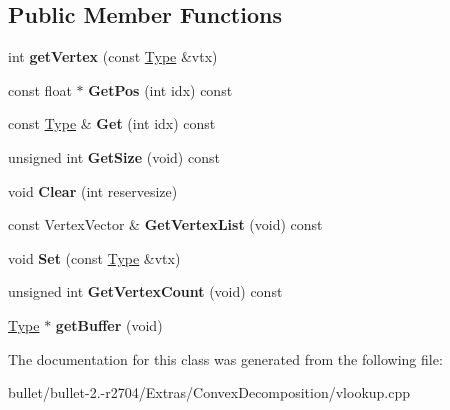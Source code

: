 \subsection*{Public Member Functions}
\begin{DoxyCompactItemize}
\item 
\hypertarget{class_vlookup_1_1_vertex_pool_a616b1df292eba5fe590800434a510fe2}{int {\bfseries get\+Vertex} (const \hyperlink{struct_type}{Type} \&vtx)}\label{class_vlookup_1_1_vertex_pool_a616b1df292eba5fe590800434a510fe2}

\item 
\hypertarget{class_vlookup_1_1_vertex_pool_aa6c1040fa6a38110dada2b7784842598}{const float $\ast$ {\bfseries Get\+Pos} (int idx) const }\label{class_vlookup_1_1_vertex_pool_aa6c1040fa6a38110dada2b7784842598}

\item 
\hypertarget{class_vlookup_1_1_vertex_pool_a84306e1f0516c4f7c217e30a2bb79e24}{const \hyperlink{struct_type}{Type} \& {\bfseries Get} (int idx) const }\label{class_vlookup_1_1_vertex_pool_a84306e1f0516c4f7c217e30a2bb79e24}

\item 
\hypertarget{class_vlookup_1_1_vertex_pool_a33f4065325a03ea3ebb6f8d15a5ce8ec}{unsigned int {\bfseries Get\+Size} (void) const }\label{class_vlookup_1_1_vertex_pool_a33f4065325a03ea3ebb6f8d15a5ce8ec}

\item 
\hypertarget{class_vlookup_1_1_vertex_pool_a37bf1be9a8a7a798439b1b7ec00d64f7}{void {\bfseries Clear} (int reservesize)}\label{class_vlookup_1_1_vertex_pool_a37bf1be9a8a7a798439b1b7ec00d64f7}

\item 
\hypertarget{class_vlookup_1_1_vertex_pool_aa4062af875235a0100ec46ae88833f8e}{const Vertex\+Vector \& {\bfseries Get\+Vertex\+List} (void) const }\label{class_vlookup_1_1_vertex_pool_aa4062af875235a0100ec46ae88833f8e}

\item 
\hypertarget{class_vlookup_1_1_vertex_pool_ad5089dc356c534baff7de4e40e13c250}{void {\bfseries Set} (const \hyperlink{struct_type}{Type} \&vtx)}\label{class_vlookup_1_1_vertex_pool_ad5089dc356c534baff7de4e40e13c250}

\item 
\hypertarget{class_vlookup_1_1_vertex_pool_a620d45a776b979ca5920302e99e2da93}{unsigned int {\bfseries Get\+Vertex\+Count} (void) const }\label{class_vlookup_1_1_vertex_pool_a620d45a776b979ca5920302e99e2da93}

\item 
\hypertarget{class_vlookup_1_1_vertex_pool_a3c064ee3529b3aeda7f5730f4caa9499}{\hyperlink{struct_type}{Type} $\ast$ {\bfseries get\+Buffer} (void)}\label{class_vlookup_1_1_vertex_pool_a3c064ee3529b3aeda7f5730f4caa9499}

\end{DoxyCompactItemize}


The documentation for this class was generated from the following file\+:\begin{DoxyCompactItemize}
\item 
bullet/bullet-\/2.-\/r2704/\+Extras/\+Convex\+Decomposition/vlookup.\+cpp\end{DoxyCompactItemize}
